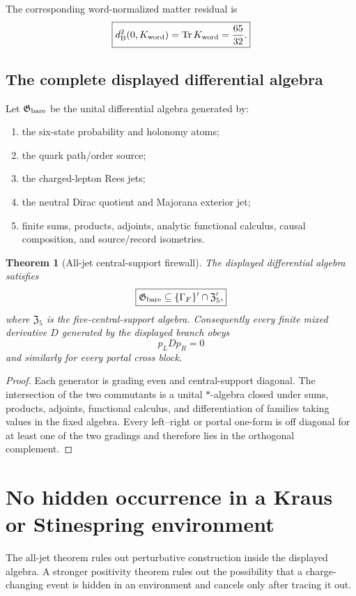 \documentclass[11pt,oneside,openany]{book}
\numberwithin{equation}{chapter}
\newtheorem{theorem}{Theorem}[chapter]
\theoremstyle{definition}
\theoremstyle{remark}
\newcommand{\Tr}{\operatorname{Tr}}
\begin{document}
The corresponding word-normalized matter residual is
\[
 \boxed{
 d_{\rm B}^2(0,K_{\rm word})
 =\Tr K_{\rm word}
 =\frac{65}{32}.
 }
\]

\section{The complete displayed differential algebra}
Let $\mathfrak G_{\rm bare}$ be the unital differential algebra generated by:
\begin{enumerate}[label=\textup{(\arabic*)},leftmargin=2.2em]
\item the six-state probability and holonomy atoms;
\item the quark path/order source;
\item the charged-lepton Rees jets;
\item the neutral Dirac quotient and Majorana exterior jet;
\item finite sums, products, adjoints, analytic functional calculus, causal composition, and source/record isometries.
\end{enumerate}

\begin{theorem}[All-jet central-support firewall]
\label{thm:all-jet-firewall}
The displayed differential algebra satisfies
\[
 \boxed{
 \mathfrak G_{\rm bare}
 \subseteq
 \{\Gamma_F\}'\cap\mathfrak Z_5',
 }
\]
where $\mathfrak Z_5$ is the five-central-support algebra.  Consequently every finite mixed derivative $D$ generated by the displayed branch obeys
\[
 \boxed{p_LDp_R=0}
\]
and similarly for every portal cross block.
\end{theorem}

\begin{proof}
Each generator is grading even and central-support diagonal.  The intersection of the two commutants is a unital $*$-algebra closed under sums, products, adjoints, functional calculus, and differentiation of families taking values in the fixed algebra.  Every left--right or portal one-form is off diagonal for at least one of the two gradings and therefore lies in the orthogonal complement.
\end{proof}

\chapter{No hidden occurrence in a Kraus or Stinespring environment}
\label{ch:no-hidden}

The all-jet theorem rules out perturbative construction inside the displayed algebra.  A stronger positivity theorem rules out the possibility that a charge-changing event is hidden in an environment and cancels only after tracing it out.
\end{document}
